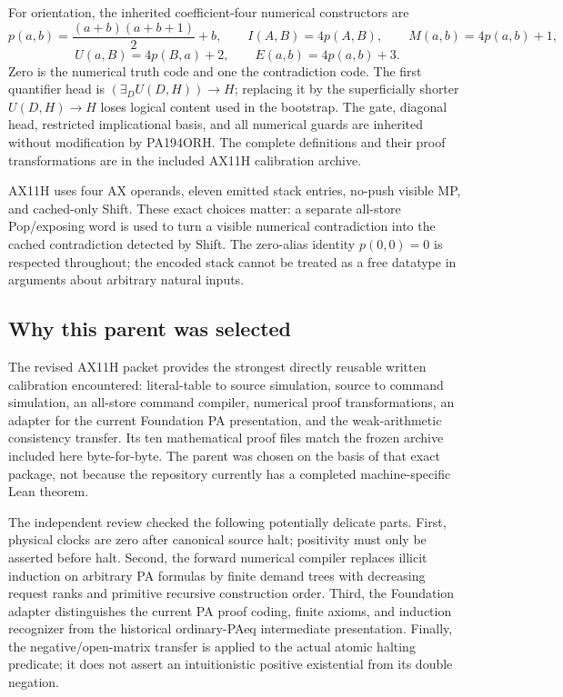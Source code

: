 \documentclass[11pt,a4paper]{article}
\theoremstyle{definition}
\begin{document}
For orientation, the inherited coefficient-four numerical constructors
are
\[
 p(a,b)=\frac{(a+b)(a+b+1)}2+b,\qquad
 I(A,B)=4p(A,B),\qquad M(a,b)=4p(a,b)+1,
\]
\[
 U(a,B)=4p(B,a)+2,\qquad E(a,b)=4p(a,b)+3.
\]
Zero is the numerical truth code and one the contradiction code.
The first quantifier head is $(\exists_D U(D,H))\to H$; replacing it by
the superficially shorter $U(D,H)\to H$ loses logical content used in
the bootstrap. The gate, diagonal head, restricted implicational
basis, and all numerical guards are inherited without modification by
PA194ORH. The complete definitions and their proof transformations are
in the included AX11H calibration archive.

AX11H uses four AX operands, eleven emitted stack entries, no-push
visible MP, and cached-only Shift. These exact choices matter: a
separate all-store Pop/exposing word is used to turn a visible numerical
contradiction into the cached contradiction detected by Shift. The
zero-alias identity $p(0,0)=0$ is respected throughout; the encoded
stack cannot be treated as a free datatype in arguments about arbitrary
natural inputs.

\subsection{Why this parent was selected}
The revised AX11H packet provides the strongest directly reusable
written calibration encountered: literal-table to source simulation,
source to command simulation, an all-store command compiler, numerical
proof transformations, an adapter for the current Foundation PA
presentation, and the weak-arithmetic consistency transfer. Its ten
mathematical proof files match the frozen archive included here
byte-for-byte. The parent was chosen on the basis of that exact package,
not because the repository currently has a completed machine-specific
Lean theorem.

The independent review checked the following potentially delicate parts.
First, physical clocks are zero after canonical source halt; positivity
must only be asserted before halt. Second, the forward numerical
compiler replaces illicit induction on arbitrary PA formulas by finite
demand trees with decreasing request ranks and primitive recursive
construction order. Third, the Foundation adapter distinguishes the
current PA proof coding, finite axioms, and induction recognizer from
the historical ordinary-PAeq intermediate presentation. Finally, the
negative/open-matrix transfer is applied to the actual atomic halting
predicate; it does not assert an intuitionistic positive existential
from its double negation.
\end{document}
